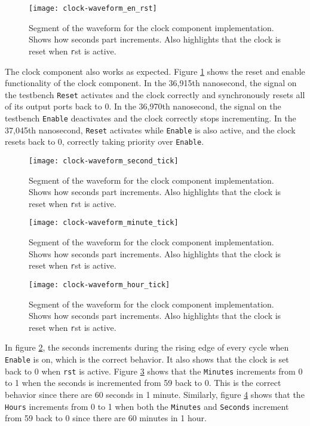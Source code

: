 \documentclass[11pt]{report}
\begin{document}
\begin{figure}[h!]
    \centering
    \texttt{[image: clock-waveform\_en\_rst]}
    \caption{
        Segment of the waveform for the clock component implementation. Shows how seconds part
        increments. Also highlights that the clock is reset when {\texttt rst} is active.
    }
    \label{fig:clock-waveform_en_rst}
\end{figure}

The clock component also works as expected. Figure \ref{fig:clock-waveform_en_rst} shows the reset
and enable functionality of the clock component. In the 36,915th nanosecond, the signal on the
testbench \verb|Reset| activates and the clock correctly and synchronously resets all of its output
ports back to 0. In the 36,970th nanosecond, the signal on the testbench \verb|Enable| deactivates
and the clock correctly stops incrementing. In the 37,045th nanosecond, \verb|Reset| activates while
\verb|Enable| is also active, and the clock resets back to 0, correctly taking priority over
\verb|Enable|.

\begin{figure}[h!]
    \centering
    \texttt{[image: clock-waveform\_second\_tick]}
    \caption{
        Segment of the waveform for the clock component implementation. Shows how seconds part
        increments. Also highlights that the clock is reset when {\texttt rst} is active.
    }
    \label{fig:clock-waveform_second_tick}
\end{figure}

\begin{figure}[h!]
    \centering
    \texttt{[image: clock-waveform\_minute\_tick]}
    \caption{
        Segment of the waveform for the clock component implementation. Shows how seconds part
        increments. Also highlights that the clock is reset when {\texttt rst} is active.
    }
    \label{fig:clock-waveform_minute_tick}
\end{figure}

\begin{figure}[h!]
    \centering
    \texttt{[image: clock-waveform\_hour\_tick]}
    \caption{
        Segment of the waveform for the clock component implementation. Shows how seconds part
        increments. Also highlights that the clock is reset when {\texttt rst} is active.
    }
    \label{fig:clock-waveform_hour_tick}
\end{figure}

In figure \ref{fig:clock-waveform_second_tick}, the seconds increments during the rising edge of
every cycle when \verb|Enable| is on, which is the correct behavior. It also shows that the clock is
set back to 0 when \verb|rst| is active. Figure \ref{fig:clock-waveform_minute_tick} shows that the
\verb|Minutes| increments from 0 to 1 when the seconds is incremented from 59 back to 0. This is the
correct behavior since there are 60 seconds in 1 minute. Similarly, figure
\ref{fig:clock-waveform_hour_tick} shows that the \verb|Hours| increments from 0 to 1 when both the
\verb|Minutes| and \verb|Seconds| increment from 59 back to 0 since there are 60 minutes in 1 hour.
\end{document}
